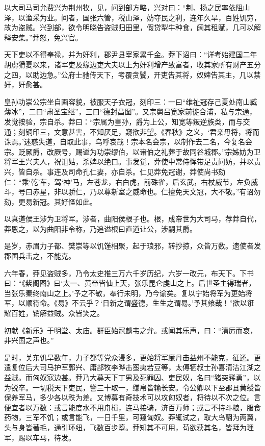 \documentclass[12pt,UTF8]{ctexbook}
\begin{document}
以大司马司允费兴为荆州牧，见，问到部方略，兴对曰：“荆、扬之民率依阻山泽，以渔采为业。间者，国张六管，税山泽，妨夺民之利，连年久旱，百姓饥穷，故为盗贼。兴到部，欲令明晓告盗贼归田里，假贷犁牛种食，阔其租赋，几可以解释安集。”莽怒，免兴官。



天下吏以不得奉禄，并为奸利，郡尹县宰家累千金。莽下诏曰：“详考始建国二年胡虏猾夏以来，诸军吏及缘边吏大夫以上为奸利增产致富者，收其家所有财产五分之四，以助边急。”公府士驰传天下，考覆贪饕，开吏告其将，奴婢告其主，几以禁奸，奸愈甚。



皇孙功崇公宗坐自画容貌，被服天子衣冠，刻印三：一曰“维祉冠存己夏处南山臧薄冰”，二曰“肃圣宝继”，三曰“德封昌图”。又宗舅吕宽家前徙合浦，私与宗通，发觉按验，宗自杀。莽曰：“宗属为皇孙，爵为上公，知宽等叛逆族类，而与交通；刻铜印三，文意甚害，不知厌足，窥欲非望。《春秋》之义，‘君亲毋将，将而诛焉。’迷惑失道，自取此事，乌呼哀哉！宗本名会宗，以制作去二名，今复名会宗。贬厥爵，改厥号，赐谥为功崇缪伯，以诸伯之礼葬于故同谷城郡。”宗姊妨为卫将军王兴夫人，祝诅姑，杀婢以绝口。事发觉，莽使中常侍恽{带足}责问妨，并以责兴，皆自杀。事连及司命孔仁妻，亦自杀。仁见莽免冠谢，莽使尚书劾仁：“乘‘乾’车，驾‘神’马，左苍龙，右白虎，前硃雀，后玄武，右杖威节，左负威斗，号曰赤星，非以骄仁，乃以尊新室之威命也。仁擅免天文冠，大不敬。”有诏勿劾，更易新冠。其好怪如此。



以真道侯王涉为卫将军。涉者，曲阳侯根子也。根，成帝世为大司马，荐莽自代，莽恩之，以为曲阳非令称，乃追谥根曰直道让公，涉嗣其爵。



是岁，赤眉力子都、樊崇等以饥馑相聚，起于琅邪，转抄掠，众皆万数。遗使者发郡国兵击之，不能克。



六年春，莽见盗贼多，乃令太史推三万六千岁历纪，六岁一改元，布天下。下书曰：“《紫阁图》曰‘太一、黄帝皆仙上天，张乐昆仑虔山之上。后世圣主得瑞者，当张乐秦终南山之上。’予之不敏，奉行未明，乃今谕矣。复以宁始将军为更始将军，以顺符命。《易》不云乎？‘日新之谓盛德，生生之谓易。’予其飨哉！”欲以诳耀百姓，销解益贼。众皆笑之。



初献《新乐》于明堂、太庙。群臣始冠麟韦之弁。或闻其乐声，曰：“清厉而哀，非兴国之声也。”



是时，关东饥旱数年，力子都等党众浸多，更始将军廉丹击益州不能克，征还。更遣复位后大司马护军郭兴、庸部牧李晔击蛮夷若豆等，太傅牺叔士孙喜清洁江湖之益贼。而匈奴寇边甚。莽乃大募天下丁男及死罪囚、吏民奴，名曰“猪突豨勇”，以为锐卒。一切税天下吏民，訾三十取一，缣帛皆输长安。令公卿以下至郡县黄绶皆保养军马，多少各以秩为差。又博募有奇技术可以攻匈奴者，将待以不次之位。言便宜者以万数：或言能度水不用舟楫，连马接骑，济百万师；或言不持斗粮，服食药物，三军不饥；或言能飞，一日千里，可窥匈奴。莽辄试之，取大鸟翮为两翼，头与身皆著毛，通引环纽，飞数百步堕。莽知其不可用，苟欲获其名，皆拜为理军，赐以车马，待发。
\end{document}
